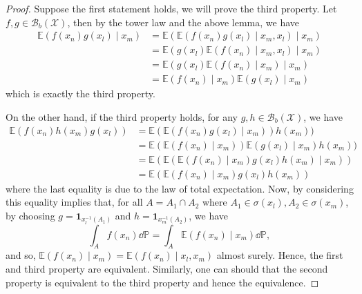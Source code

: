\documentclass[]{article}
\theoremstyle{definition}
\theoremstyle{definition}
\begin{document}
\begin{proof}
  Suppose the first statement holds, we will prove the third property. 
  Let \(f, g \in \mathcal{B}_b(\mathcal{X})\), then by the tower law and the above lemma, 
  we have 
  \[\begin{split}
    \mathbb{E}(f(x_n)g(x_l) \mid x_m) & = \mathbb{E}(\mathbb{E}(f(x_n)g(x_l) \mid x_m, x_l) \mid x_m)\\
    & = \mathbb{E}(g(x_l) \mathbb{E}(f(x_n) \mid x_m, x_l) \mid x_m)\\
    & = \mathbb{E}(g(x_l) \mathbb{E}(f(x_n) \mid x_m) \mid x_m)\\
    & = \mathbb{E}(f(x_n) \mid x_m)\mathbb{E}(g(x_l) \mid x_m)
  \end{split}\]
  which is exactly the third property.

  On the other hand, if the third property holds, for any \(g, h \in \mathcal{B}_b(\mathcal{X})\), 
  we have 
  \[\begin{split}
    \mathbb{E}(f(x_n)h(x_m)g(x_l)) & = \mathbb{E}(\mathbb{E}(f(x_n)g(x_l) \mid x_m)) h(x_m))\\
    & = \mathbb{E}(\mathbb{E}(f(x_n) \mid x_m)) \mathbb{E}(g(x_l) \mid x_m) h(x_m))\\
    & = \mathbb{E}(\mathbb{E}(\mathbb{E}(f(x_n) \mid x_m)g(x_l)h(x_m) \mid x_m))\\
    & = \mathbb{E}(\mathbb{E}(f(x_n) \mid x_m)g(x_l)h(x_m))
  \end{split}\]
  where the last equality is due to the law of total expectation. Now, by considering 
  this equality implies that, for all \(A = A_1 \cap A_2\) where 
  \(A_1 \in \sigma(x_l), A_2 \in \sigma(x_m)\), by choosing \(g = \mathbf{1}_{x_l^{-1}(A_1)}\) 
  and \(h = \mathbf{1}_{x_m^{-1}(A_2)}\), we have
  \[\int_A f(x_n) \dd \mathbb{P} = \int_A \mathbb{E}(f(x_n) \mid x_m) \dd \mathbb{P},\]
  and so, \(\mathbb{E}(f(x_n) \mid x_m) = \mathbb{E}(f(x_n) \mid x_l, x_m)\) almost 
  surely. Hence, the first and third property are equivalent. Similarly, one 
  can should that the second property is equivalent to the third property and 
  hence the equivalence.
\end{proof}
\end{document}
